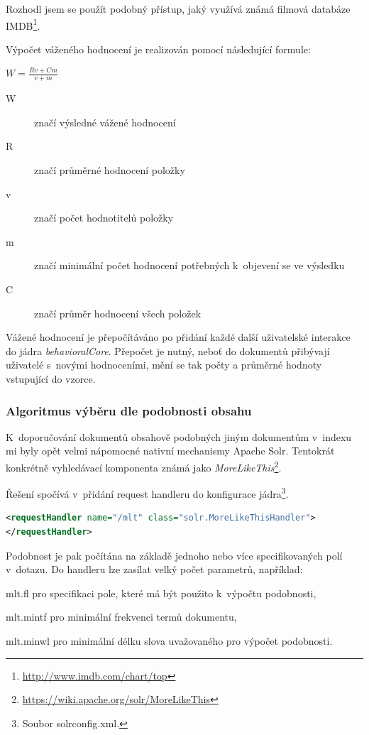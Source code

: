 \documentclass[thesis=M,czech]{FITthesis}[2014/05/07]
\begin{document}
Rozhodl jsem se použít podobný přístup, jaký využívá známá filmová databáze IMDB\footnote{\url{http://www.imdb.com/chart/top}}. 

Výpočet váženého hodnocení je realizován pomocí následující formule:

\begin{center}
$W = \frac{Rv + Cm}{v + m}$
\end{center}

\begin{description}
	\item[W] značí výsledné vážené hodnocení
	\item[R] značí průměrné hodnocení položky
	\item[v] značí počet hodnotitelů položky
	\item[m] značí minimální počet hodnocení potřebných k~objevení se ve výsledku
	\item[C] značí průměr hodnocení všech položek
\end{description}

Vážené hodnocení je přepočítáváno po přidání každé další uživatelské interakce do jádra \emph{behavioralCore}. Přepočet je nutný, neboť do dokumentů přibývají uživatelé s~novými hodnoceními, mění se tak počty a průměrné hodnoty vstupující do vzorce.

\subsubsection{Algoritmus výběru dle podobnosti obsahu}
K~doporučování dokumentů obsahově podobných jiným dokumentům v~indexu mi byly opět velmi nápomocné nativní mechanismy Apache Solr. Tentokrát konkrétně vyhledávací komponenta známá jako \emph{MoreLikeThis}\footnote{\url{https://wiki.apache.org/solr/MoreLikeThis}}.

Řešení spočívá v~přidání request handleru do konfigurace jádra\footnote{Soubor solrconfig.xml.}.

\begin{lstlisting}[language=xml]
<requestHandler name="/mlt" class="solr.MoreLikeThisHandler">
</requestHandler>
\end{lstlisting}

Podobnost je pak počítána na základě jednoho nebo více specifikovaných polí v~dotazu. Do handleru lze zasílat velký počet parametrů, například:

\begin{description}
	\item mlt.fl pro specifikaci pole, které má být použito k~výpočtu podobnosti,
	\item mlt.mintf pro minimální frekvenci termů dokumentu,
	\item mlt.minwl pro minimální délku slova uvažovaného pro výpočet podobnosti.
\end{description}
\end{document}
